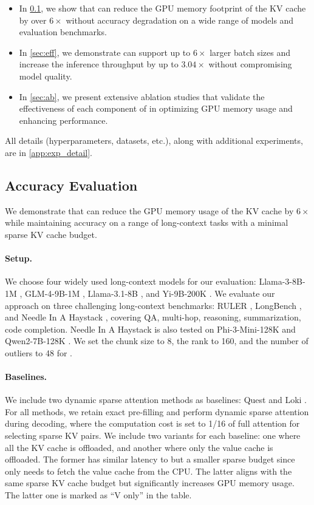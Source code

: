 \begin{itemize}
	\item In \cref{sec:acc}, we show that \Sys can reduce the GPU memory footprint of the KV cache by over $6\times$ without accuracy degradation on a wide range of models and evaluation benchmarks.
	\item In \cref{sec:eff}, we demonstrate \Sys can support up to $6\times$ larger batch sizes and increase the inference throughput by up to $3.04\times$ without compromising model quality.
	\item In \cref{sec:ab}, we present extensive ablation studies that validate the effectiveness of each component of \Sys in optimizing GPU memory usage and enhancing performance.
\end{itemize}

All details (hyperparameters, datasets, etc.), along with additional experiments, are in \cref{app:exp_detail}.

\subsection{Accuracy Evaluation}
\label{sec:acc}
We demonstrate that \Sys can reduce the GPU memory usage of the KV cache by $6\times$ while maintaining accuracy on a range of long-context tasks with a minimal sparse KV cache budget.

\paragraph{Setup.} We choose four widely used long-context models for our evaluation: Llama-3-8B-1M \citep{gradllama}, GLM-4-9B-1M \citep{glm2024chatglm}, Llama-3.1-8B \citep{meta_llama_3_1}, and Yi-9B-200K \citep{ai2024yi}. We evaluate our approach on three challenging long-context benchmarks: RULER \citep{hsieh2024ruler}, LongBench \citep{bai2023longbench}, and Needle In A Haystack \citep{niah}, covering QA, multi-hop, reasoning, summarization, code completion. Needle In A Haystack is also tested on Phi-3-Mini-128K \citep{abdin2024phi} and Qwen2-7B-128K \citep{yang2024qwen2}. We set the chunk size to 8, the rank to 160, and the number of outliers to 48 for \Sys.

\paragraph{Baselines.} We include two dynamic sparse attention methods as baselines: Quest \citep{tang2024quest} and Loki \citep{singhania2024loki}. For all methods, we retain exact pre-filling and perform dynamic sparse attention during decoding, where the computation cost is set to 1/16 of full attention for selecting sparse KV pairs. We include two variants for each baseline: one where all the KV cache is offloaded, and another where only the value cache is offloaded. The former has similar latency to \Sys but a smaller sparse budget since \Sys only needs to fetch the value cache from the CPU. The latter aligns with the same sparse KV cache budget but significantly increases GPU memory usage. The latter one is marked as ``V only'' in the table.

